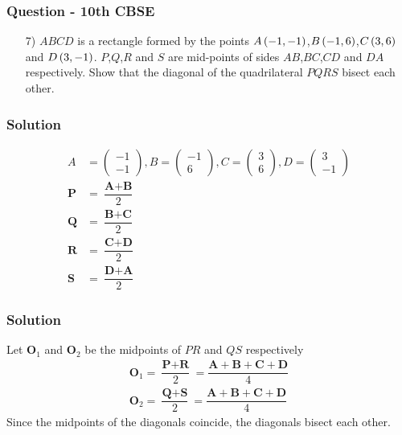\documentclass{beamer}
\begin{document}
\begin{frame}
\frametitle{Question - 10th CBSE}
\begin{enumerate}
    \item [7)]
$ABCD$ is a rectangle formed by the points $A\left(-1,-1\right)$,$B\left(-1,6\right)$,$C\left(3,6\right)$ and $D\left(3,-1\right)$. $P$,$Q$,$R$ and $S$ are mid-points of sides $AB$,$BC$,$CD$ and $DA$ respectively. Show that the diagonal of the quadrilateral $PQRS$ bisect each other. 
\end{enumerate}
\end{frame}






\begin{frame}
\frametitle{Solution}
\begin{align}
    A &= \begin{pmatrix}
        -1\\
        -1
    \end{pmatrix},
    B = \begin{pmatrix}
        -1\\
        6
    \end{pmatrix},
    C = \begin{pmatrix}
        3\\
        6
    \end{pmatrix},
    D = \begin{pmatrix}
        3\\
        -1
    \end{pmatrix}\\
    \textbf{P}&=\dfrac{\textbf{A}+\textbf{B}}{2}\\
        \textbf{Q}&=\dfrac{\textbf{B}+\textbf{C}}{2}\\
    \textbf{R}&=\dfrac{\textbf{C}+\textbf{D}}{2}\\
    \textbf{S}&=\dfrac{\textbf{D}+\textbf{A}}{2}
    \end{align}
\end{frame}




\begin{frame}
\frametitle{Solution}
Let $\textbf{O}_1$ and $\textbf{O}_2$ be the midpoints of $PR$ and $QS$ respectively
\begin{align}
    \textbf{O}_1 = \dfrac{\textbf{P}+\textbf{R}}{2}=\dfrac{\textbf{A}+\textbf{B}+\textbf{C}+\textbf{D}}{4}\\
      \textbf{O}_2 = \dfrac{\textbf{Q}+\textbf{S}}{2}=\dfrac{\textbf{A}+\textbf{B}+\textbf{C}+\textbf{D}}{4}
\end{align}
Since the midpoints of the diagonals coincide, the diagonals bisect each other. 
\end{frame}
\end{document}
